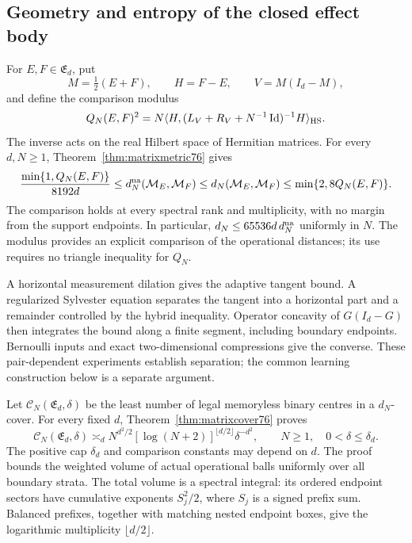 \subsection{Geometry and entropy of the closed effect body}
For $E,F\in\mathfrak E_d$, put
\[
 M=\tfrac12(E+F),\qquad H=F-E,\qquad V=M(I_d-M),
\]
and define the comparison modulus
\[
 Q_N(E,F)^2=N\langle H,
       (L_V+R_V+N^{-1}\operatorname{Id})^{-1}H\rangle_{\rm HS}.
\]
The inverse acts on the real Hilbert space of Hermitian matrices.
For every $d,N\ge1$, Theorem~\ref{thm:matrixmetric76} gives
\begin{equation}\label{eq:intrometric77}
 \frac{\min\{1,Q_N(E,F)\}}{8192d}
 \le d_N^{\rm na}(\mathcal M_E,\mathcal M_F)
 \le d_N(\mathcal M_E,\mathcal M_F)
 \le\min\{2,8Q_N(E,F)\}.
\end{equation}
The comparison holds at every spectral rank and multiplicity, with
no margin from the support endpoints.  In particular,
$d_N\le65536d\,d_N^{\rm na}$ uniformly in $N$.  The modulus
provides an explicit comparison of the operational distances;
its use requires no triangle inequality for $Q_N$.

A horizontal measurement dilation gives the adaptive tangent bound.
A regularized Sylvester equation separates the tangent into a
horizontal part and a remainder controlled by the hybrid inequality.
Operator concavity of $G(I_d-G)$ then integrates the bound along
a finite segment, including boundary endpoints.  Bernoulli inputs
and exact two-dimensional compressions give the converse.  These
pair-dependent experiments establish separation; the common
learning construction below is a separate argument.

Let $\mathcal C_N(\mathfrak E_d,\delta)$ be the least number of
legal memoryless binary centres in a $d_N$-cover.  For every fixed
$d$, Theorem~\ref{thm:matrixcover76} proves
\begin{equation}\label{eq:introentropy77}
 \mathcal C_N(\mathfrak E_d,\delta)
 \asymp_d N^{d^2/2}[\log(N+2)]^{\lfloor d/2\rfloor}\delta^{-d^2},
 \qquad N\ge1,\quad0<\delta\le\delta_d.
\end{equation}
The positive cap $\delta_d$ and comparison constants may depend
on $d$.  The proof bounds the weighted volume of actual operational
balls uniformly over all boundary strata.  The total volume is a
spectral integral: its ordered endpoint sectors have cumulative
exponents $S_j^2/2$, where $S_j$ is a signed prefix sum.  Balanced
prefixes, together with matching nested endpoint boxes, give the
logarithmic multiplicity $\lfloor d/2\rfloor$.

